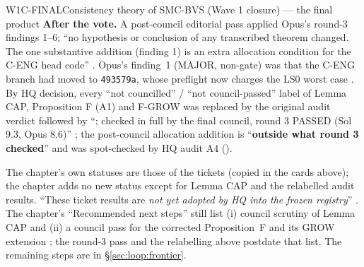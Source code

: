 \begin{card}{W1C-FINAL}{Consistency theory of SMC-BVS (Wave 1 closure) — the final product}
\textbf{After the vote.} A post-council editorial pass applied Opus's round-3 findings 1--6; ``no hypothesis or conclusion of any transcribed theorem changed. The one substantive addition (finding 1) is an extra allocation condition for the C-ENG head code'' . Opus's finding~1 (MAJOR, non-gate) was that the C-ENG branch had moved to \texttt{493579a}, whose preflight now charges the LS0 worst case . By HQ decision, every ``not councilled'' / ``not council-passed'' label of Lemma CAP, Proposition F (A1) and F-GROW was replaced by the original audit verdict followed by ``; checked in full by the final council, round 3 PASSED (Sol 9.3, Opus 8.6)'' ; the post-council allocation addition is ``\textbf{outside what round 3 checked}''  and was spot-checked by HQ audit A4 ().
\begin{agentnote}
The chapter's own statuses are those of the tickets (copied in the cards above); the chapter adds no new status except for Lemma CAP and the relabelled audit results. ``These ticket results are \emph{not yet adopted by HQ into the frozen registry}'' . The chapter's ``Recommended next steps'' still list (i) council scrutiny of Lemma CAP and (ii) a council pass for the corrected Proposition~F and its GROW extension ; the round-3 pass and the relabelling above postdate that list. The remaining steps are in \S\ref{sec:loop:frontier}.
\end{agentnote}
\end{card}

